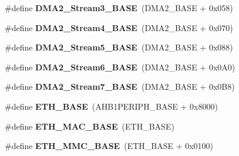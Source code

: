 \begin{DoxyCompactItemize}
\item 
\hypertarget{group___peripheral__memory__map_gaf3a9480e08c6ae94f4482e0cdaebdd17}{\#define {\bfseries D\-M\-A2\-\_\-\-Stream3\-\_\-\-B\-A\-S\-E}~(D\-M\-A2\-\_\-\-B\-A\-S\-E + 0x058)}\label{group___peripheral__memory__map_gaf3a9480e08c6ae94f4482e0cdaebdd17}

\item 
\hypertarget{group___peripheral__memory__map_gad1e67740e6301233473f64638145dd1f}{\#define {\bfseries D\-M\-A2\-\_\-\-Stream4\-\_\-\-B\-A\-S\-E}~(D\-M\-A2\-\_\-\-B\-A\-S\-E + 0x070)}\label{group___peripheral__memory__map_gad1e67740e6301233473f64638145dd1f}

\item 
\hypertarget{group___peripheral__memory__map_gaed1460fdc407b6decfbffccb0260d0af}{\#define {\bfseries D\-M\-A2\-\_\-\-Stream5\-\_\-\-B\-A\-S\-E}~(D\-M\-A2\-\_\-\-B\-A\-S\-E + 0x088)}\label{group___peripheral__memory__map_gaed1460fdc407b6decfbffccb0260d0af}

\item 
\hypertarget{group___peripheral__memory__map_ga5e81174c96fd204fa7c82c815e85c8e6}{\#define {\bfseries D\-M\-A2\-\_\-\-Stream6\-\_\-\-B\-A\-S\-E}~(D\-M\-A2\-\_\-\-B\-A\-S\-E + 0x0\-A0)}\label{group___peripheral__memory__map_ga5e81174c96fd204fa7c82c815e85c8e6}

\item 
\hypertarget{group___peripheral__memory__map_gaa9faa708ad2440d24eb1064cba9bb06d}{\#define {\bfseries D\-M\-A2\-\_\-\-Stream7\-\_\-\-B\-A\-S\-E}~(D\-M\-A2\-\_\-\-B\-A\-S\-E + 0x0\-B8)}\label{group___peripheral__memory__map_gaa9faa708ad2440d24eb1064cba9bb06d}

\item 
\hypertarget{group___peripheral__memory__map_gad965a7b1106ece575ed3da10c45c65cc}{\#define {\bfseries E\-T\-H\-\_\-\-B\-A\-S\-E}~(A\-H\-B1\-P\-E\-R\-I\-P\-H\-\_\-\-B\-A\-S\-E + 0x8000)}\label{group___peripheral__memory__map_gad965a7b1106ece575ed3da10c45c65cc}

\item 
\hypertarget{group___peripheral__memory__map_ga3cf7005808feb61bff1fee01e50a711a}{\#define {\bfseries E\-T\-H\-\_\-\-M\-A\-C\-\_\-\-B\-A\-S\-E}~(E\-T\-H\-\_\-\-B\-A\-S\-E)}\label{group___peripheral__memory__map_ga3cf7005808feb61bff1fee01e50a711a}

\item 
\hypertarget{group___peripheral__memory__map_ga4946f2b3b03f7998343ac1778fbcf725}{\#define {\bfseries E\-T\-H\-\_\-\-M\-M\-C\-\_\-\-B\-A\-S\-E}~(E\-T\-H\-\_\-\-B\-A\-S\-E + 0x0100)}\label{group___peripheral__memory__map_ga4946f2b3b03f7998343ac1778fbcf725}


\end{DoxyCompactItemize}
